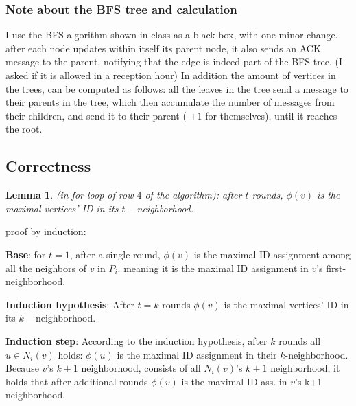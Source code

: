 \documentclass[11pt]{article}
\newtheorem{lemma}[theorem]{Lemma}
\begin{document}
\subsubsection*{Note about the BFS tree and calculation}
I use the BFS algorithm shown in class as a black box, with one minor change. after each node updates within itself its parent node, it also sends an ACK message to the parent, notifying that the edge is indeed part of the BFS tree. (I asked if it is allowed in a reception hour)
In addition the amount of vertices in the trees, can be computed as follows: all the leaves in the tree send a message to their parents in the tree, which then accumulate the number of messages from their children, and send it to their parent ( $+1$ for themselves), until it reaches the root.

\subsection*{Correctness}

\begin{lemma}
\label{t_neighborhood}
(in for loop of row $4$ of the algorithm): after $t$ rounds, $\phi(v)$ is the maximal vertices' ID in its $t-$neighborhood.
\end{lemma}
proof by induction: 

\textbf{Base}: for $t=1$, after a single round, $\phi(v)$ is the maximal ID assignment among all the neighbors of $v$ in $P_i$. meaning it is the maximal ID assignment in $v$'s first-neighborhood.

\textbf{Induction hypothesis}: After $t=k$ rounds $\phi(v)$ is the maximal vertices' ID in its $k-$neighborhood.

\textbf{Induction step}: According to the induction hypothesis, after $k$ rounds all $u \in N_i(v)$ holds: $\phi(u)$ is the maximal ID assignment in their $k$-neighborhood. Because $v$'s $k+1$ neighborhood, consists of all $N_i(v)$'s $k+1$ neighborhood, it holds that after additional rounds $\phi(v)$ is the maximal ID ass. in $v$'s k+1 neighborhood.
\end{document}
